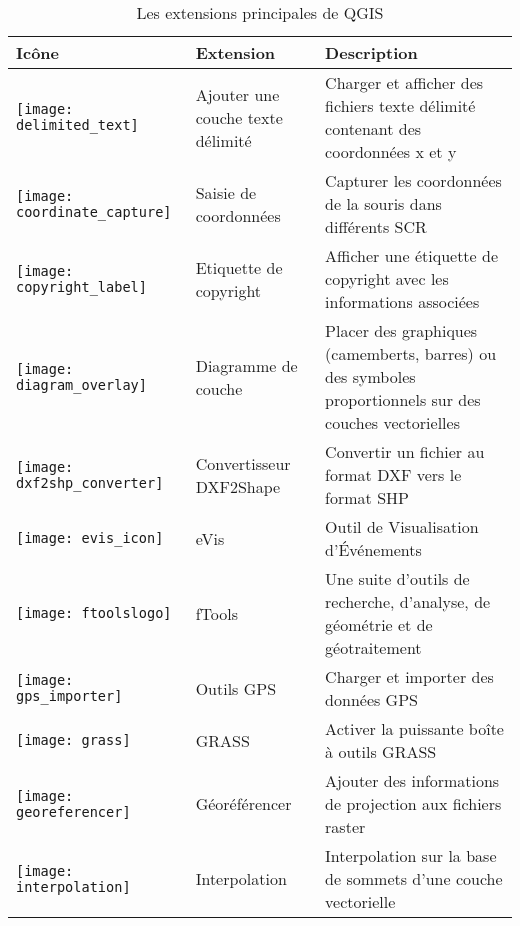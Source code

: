 \begin{minipage}{\textwidth}
\begin{table}[H]
\centering
\caption{Les extensions principales de QGIS}\label{tab:core_plugins}\medskip
\small
 \begin{tabular}{|l|l|p{4in}|}
\hline \textbf{Icône} & \textbf{Extension} & \textbf{Description}\\
\hline
\texttt{[image: delimited\_text]}
 & Ajouter une couche texte délimité \index{extensions!texte delimite} & Charger et afficher des fichiers texte délimité contenant des coordonnées x et y\\
\hline
\texttt{[image: coordinate\_capture]}
 & Saisie de coordonnées \index{extensions!saisie de coordonnees} & Capturer les coordonnées de la souris dans différents SCR\\
\hline 
\texttt{[image: copyright\_label]}
 & Etiquette de copyright \index{extensions!copyright} & Afficher une étiquette de copyright avec les informations associées\\
\hline
\texttt{[image: diagram\_overlay]}
 & Diagramme de couche \index{plugins!diagram} & Placer des graphiques (camemberts, barres) ou des symboles proportionnels sur des couches vectorielles\\
\hline
\texttt{[image: dxf2shp\_converter]}
 & Convertisseur DXF2Shape \index{plugins!DXF2Shape} & Convertir un fichier au format DXF vers le format SHP\\
\hline
\texttt{[image: evis\_icon]}
 & eVis & Outil de Visualisation d'Événements\\
\hline
\texttt{[image: ftoolslogo]}
 & fTools \index{plugins!ftools} & Une suite d'outils de recherche, d'analyse, de géométrie et de géotraitement\\
\hline
\texttt{[image: gps\_importer]}
 & Outils GPS \index{plugins!gps} & Charger et importer des données GPS\\
\hline
\texttt{[image: grass]}
 & GRASS \index{plugin!grass toolbox} & Activer la puissante boîte à outils GRASS\\
\hline
\texttt{[image: georeferencer]}
 & Géoréférencer \index{plugin!georeferencer} & Ajouter des informations de projection aux fichiers raster\\
\hline
\texttt{[image: interpolation]}
& Interpolation \index{plugins!Interpolation} & Interpolation sur la base de sommets d'une couche vectorielle\\

\end{tabular}
\end{table}
\end{minipage}
